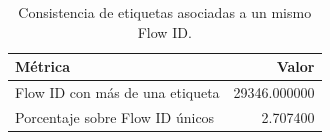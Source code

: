 \begin{table}
\caption{Consistencia de etiquetas asociadas a un mismo Flow ID.}
\label{tab:consistencia_flowid}
\begin{tabular}{lr}
\toprule
Métrica & Valor \\
\midrule
Flow ID con más de una etiqueta & 29346.000000 \\
Porcentaje sobre Flow ID únicos & 2.707400 \\
\bottomrule
\end{tabular}
\end{table}
